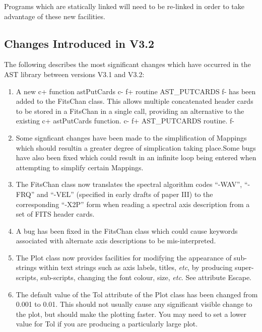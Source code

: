 \documentclass[twoside,11pt]{article}
\begin{document}
Programs which are statically linked will need to be re-linked in
order to take advantage of these new facilities.


\subsection{Changes Introduced in V3.2}

The following describes the most significant changes which have
occurred in the AST library between versions V3.1 and V3.2:

\begin{enumerate}

\item A new
c+
function astPutCards
c-
f+
routine AST\_PUTCARDS
f-
has been added to the FitsChan class. This allows multiple concatenated header 
cards to be stored in a FitsChan in a single call, providing an alternative to 
the existing
c+
astPutCards function.
c-
f+
AST\_PUTCARDS routine.
f-

\item Some signficant changes have been made to the simplification of Mappings
 which should resultin a greater degree of simplication taking place.Some
 bugs have also been fixed which could result in an infinite loop being
 entered when attempting to simplify certain Mappings.

\item The FitsChan class now translates the spectral algorithm codes 
``-WAV'', ``-FRQ'' and ``-VEL'' (specified in early drafts of paper III) to 
the corresponding ``-X2P'' form when reading a spectral axis description
from a set of FITS header cards.

\item A bug has been fixed in the FitsChan class which could cause 
keywords associated with alternate axis descriptions to be mis-interpreted.

\item The Plot class now provides facilities for modifying the appearance
of sub-strings within text strings such as axis labels, titles, \emph{etc},
by producing super-scripts, sub-scripts, changing the font colour, size, 
\emph{etc}. See attribute Escape.

\item The default value of the Tol attribute of the Plot class has been
changed from 0.001 to 0.01. This should not usually cause any significant 
visible change to the plot, but should make the plotting faster. You may
need to set a lower value for Tol if you are producing a particularly
large plot.


\end{enumerate}
\end{document}
